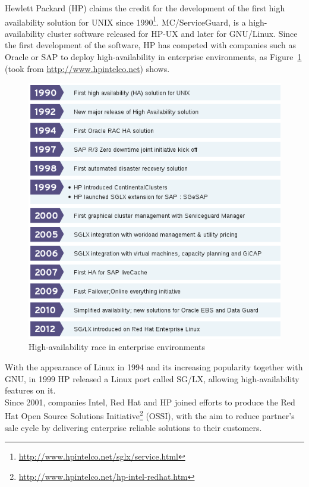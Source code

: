\documentclass[a4paper, 12pt]{book}
\begin{document}
Hewlett Packard (HP) claims the credit for the development of the first high availability solution for UNIX since 1990\footnote{\url{http://www.hpintelco.net/sglx/service.html}}. MC/ServiceGuard, is a high-availability cluster software released for HP-UX and later for GNU/Linux. Since the first development of the software, HP has competed with companies such as Oracle or SAP to deploy high-availability in enterprise environments, as Figure~\ref{fig:enterprise} (took from \url{http://www.hpintelco.net}) shows.

\begin{figure}[H]
  \centering
  \includegraphics[scale=0.70]{commercial-ha.png}
  \caption[High-availability race in enterprise environments]{High-availability race in enterprise environments}
  \label{fig:enterprise}
\end{figure}

\noindent With the appearance of Linux in 1994 and its increasing popularity together with GNU, in 1999 HP released a Linux port called SG/LX, allowing high-availability features on it.\\

\noindent Since 2001, companies Intel, Red Hat and HP joined efforts to produce the Red Hat Open Source Solutions Initiative\footnote{\url{http://www.hpintelco.net/hp-intel-redhat.htm}} (OSSI), with the aim to reduce partner's sale cycle by delivering enterprise reliable solutions to their customers.
\end{document}
